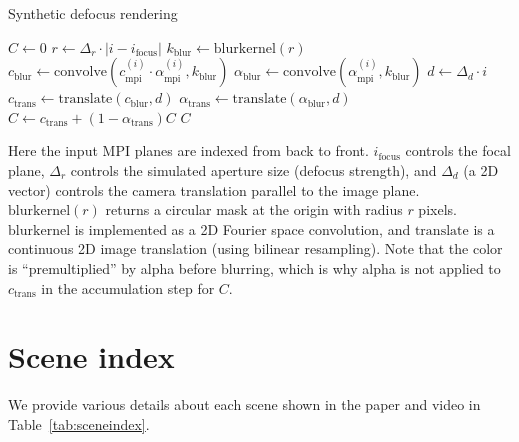 \begin{algorithm}
\caption{Synthetic defocus rendering}\label{alg:defocus}
\begin{algorithmic}
\State $C \gets 0$ %
    \State $r \gets \Delta_r \cdot |i - i_\textrm{focus}|$
    \State $k_\textrm{blur} \gets  \mathrm{blurkernel}(r)$
    \State $c_\textrm{blur} \gets \mathrm{convolve}(c_{\textrm{mpi}}^{(i)} \cdot \alpha_{\textrm{mpi}}^{(i)}, k_\textrm{blur})$
    \State $\alpha_\textrm{blur} \gets \mathrm{convolve}(\alpha_{\textrm{mpi}}^{(i)}, k_\textrm{blur})$
    \State $d \gets \Delta_d \cdot i$
    \State $c_\textrm{trans} \gets \mathrm{translate}(c_{\textrm{blur}}, d)$
    \State $\alpha_\textrm{trans} \gets \mathrm{translate}(\alpha_{\textrm{blur}}, d)$
    \State $C \gets c_\textrm{trans} + (1-\alpha_\textrm{trans}) C$
\EndFor
\State \Return $C$
\EndProcedure
\end{algorithmic}
\end{algorithm}
Here the input MPI planes are indexed from back to front. $i_\textrm{focus}$ controls the focal plane, $\Delta_r$ controls the simulated aperture size (defocus strength), and $\Delta_d$ (a 2D vector) controls the camera translation parallel to the image plane. $\mathrm{blurkernel}(r)$ returns a circular mask at the origin with radius $r$ pixels. $\mathrm{blurkernel}$ is implemented as a 2D Fourier space convolution, and $\mathrm{translate}$ is a continuous 2D image translation (using bilinear resampling). Note that the color is ``premultiplied'' by alpha before blurring, which is why alpha is not applied to $c_\textrm{trans}$ in the accumulation step for $C$.

\section{Scene index}

We provide various details about each scene shown in the paper and video in Table~\ref{tab:sceneindex}.


